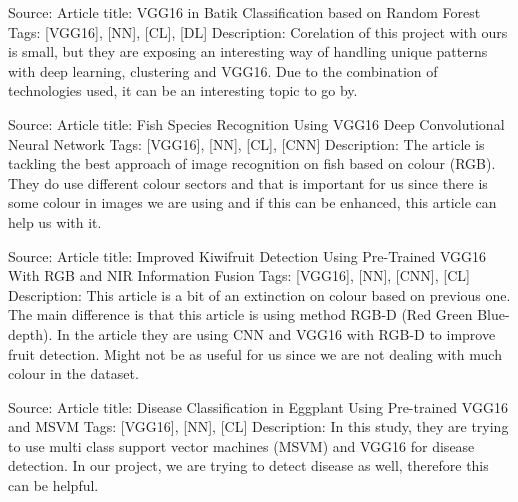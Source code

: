 Source: \parencite{arsa2019vgg16}
\newline
Article title: VGG16 in Batik Classification based on Random Forest 
\newline
Tags: [VGG16], [NN], [CL], [DL]
\newline
Description:
\newline
Corelation of this project with ours is small, but they are exposing an interesting way of handling unique patterns with deep learning, clustering and VGG16. Due to the combination of technologies used, it can be an interesting topic to go by.
\newline

Source: \parencite{hridayami2019fish}
\newline
Article title: Fish Species Recognition Using VGG16 Deep Convolutional Neural Network
\newline
Tags: [VGG16], [NN], [CL], [CNN]
\newline
Description:
\newline
The article is tackling the best approach of image recognition on fish based on colour (RGB). They do use different colour sectors and that is important for us since there is some colour in images we are using and if this can be enhanced, this article can help us with it.
\newline

Source: \parencite{liu2019improved}
\newline
Article title: Improved Kiwifruit Detection Using Pre-Trained VGG16 With RGB and NIR Information Fusion
\newline
Tags: [VGG16], [NN], [CNN], [CL]
\newline
Description:
\newline
This article is a bit of an extinction on colour based on previous one. The main difference is that this article is using method RGB-D (Red Green Blue-depth). In the article they are using CNN and VGG16 with RGB-D to improve fruit detection. Might not be as useful for us since we are not dealing with much colour in the dataset.
\newline

Source: \parencite{krishnaswamy2020disease}
\newline
Article title: Disease Classification in Eggplant Using Pre-trained VGG16 and MSVM 
\newline
Tags: [VGG16], [NN], [CL]
\newline
Description:
\newline
In this study, they are trying to use multi class support vector machines (MSVM) and VGG16 for disease detection. In our project, we are trying to detect disease as well, therefore this can be helpful.
\newline

